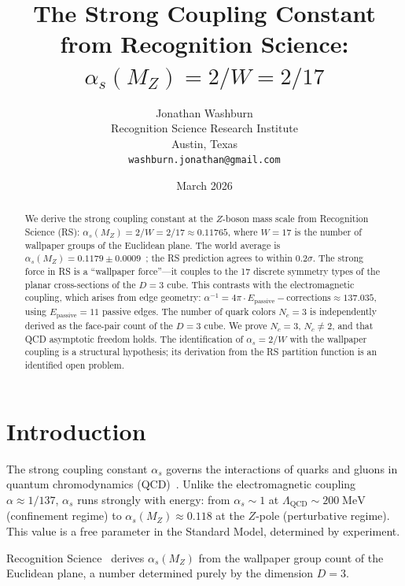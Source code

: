 \documentclass[12pt,a4paper]{article}
\title{The Strong Coupling Constant from Recognition Science:\\
$\alpha_s(M_Z) = 2/W = 2/17$}
\author{Jonathan Washburn\\
Recognition Science Research Institute\\
Austin, Texas\\
\texttt{washburn.jonathan@gmail.com}}
\date{March 2026}
\theoremstyle{definition}
\theoremstyle{remark}
\begin{document}
\maketitle

\begin{abstract}
We derive the strong coupling constant at the $Z$-boson mass
scale from Recognition Science (RS):
$\alpha_s(M_Z) = 2/W = 2/17 \approx 0.11765$, where $W = 17$
is the number of wallpaper groups of the Euclidean plane.  The
world average is $\alpha_s(M_Z) = 0.1179 \pm 0.0009$~\cite{PDG2024};
the RS prediction agrees to within $0.2\sigma$.  The strong force in RS
is a ``wallpaper force''---it couples to the 17 discrete
symmetry types of the planar cross-sections of the $D = 3$
cube.  This contrasts with the electromagnetic coupling, which
arises from edge geometry:
$\alpha^{-1} = 4\pi \cdot E_{\mathrm{passive}} - \mathrm{corrections}
\approx 137.035$, using $E_{\mathrm{passive}} = 11$ passive
edges.  The number of quark colors $N_c = 3$ is independently
derived as the face-pair count of the $D = 3$ cube.  We prove
$N_c = 3$, $N_c \neq 2$, and that QCD asymptotic freedom holds.
The identification of $\alpha_s = 2/W$ with the wallpaper
coupling is a structural hypothesis; its derivation from the
RS partition function is an identified open problem.
\end{abstract}

\section{Introduction}
\label{sec:intro}

The strong coupling constant $\alpha_s$ governs the interactions
of quarks and gluons in quantum chromodynamics
(QCD)~\cite{Gross1973, Politzer1973}.  Unlike the
electromagnetic coupling $\alpha \approx 1/137$, $\alpha_s$ runs
strongly with energy: from $\alpha_s \sim 1$ at
$\Lambda_{\mathrm{QCD}} \sim 200\;\mathrm{MeV}$ (confinement
regime) to $\alpha_s(M_Z) \approx 0.118$ at the $Z$-pole
(perturbative regime).  This value is a free parameter in the
Standard Model, determined by experiment.

Recognition Science~\cite{RS_Axioms} derives $\alpha_s(M_Z)$ from
the wallpaper group count of the Euclidean plane, a number
determined purely by the dimension $D = 3$.

\end{document}
